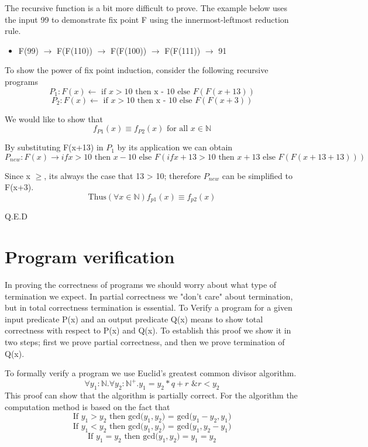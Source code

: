 \documentclass{article}
\begin{document}
The recursive function is a bit more difficult to prove. The example below uses the input 99 to demonstrate fix point F using the innermost-leftmost reduction rule. 

\begin{itemize}
  \item F(99) $\rightarrow$ F(F(110)) $\rightarrow$  F(F(100)) $\rightarrow$ F(F(111)) $\rightarrow$ 91
\end{itemize}

To show the power of fix point induction, consider the following recursive programs
\[P_1: F(x) \leftarrow \text{ if } x > 10\text{ then x - 10 else }F(F(x+13))\]
\[P_2: F(x) \leftarrow \text{ if } x > 10\text{ then x - 10 else }F(F(x+3))\]

We would like to show that 
\[f_{P1} (x) \equiv f_{P2} (x) \text{ for all } x \in \mathbb{N}\] 

By substituting F(x+13) in $P_1$ by its application we can obtain 
\[P_{new}: F(x) \rightarrow if x > 10 \text{ then } x - 10 \text{ else } F( if x + 13 > 10 \text{ then } x + 13 \text{ else } F(F(x+13 + 13)))\]

Since x $\geq$, its always the case that 13 > 10; therefore $P_{new}$ can be simplified to F(x+3). 
\[\text{Thus} (\forall x \in \mathbb{N}) f_{p1} (x) \equiv f_{p2} (x)\]

Q.E.D

\section{Program verification }

In proving the correctness of programs we should worry about what type of termination we expect. In partial correctness we "don't care" about termination, but in total correctness termination is essential. To Verify a program for a given input predicate P(x) and an output predicate Q(x) means to show total correctness with respect to P(x) and Q(x). To establish this proof we show it in two steps; first we prove partial correctness, and then we prove termination of Q(x). 

To formally verify a program we use Euclid's greatest common divisor algorithm. 
\[\forall y_1 :\mathbb{N}. \forall y_2:\mathbb{N}^+ . y_1 = y_2 * q + r \text{ \& } r < y_2\]
This proof can show that the algorithm is partially correct. For the algorithm the computation method is based on the fact that 
\[\text{If  }y_1 >  y_2\text{ then  gcd(}y_1,y_2\text{) =  gcd(}y_1-y_2, y_1)\]
\[\text{If  }y_1 < y_2\text{ then  gcd(}y_1,y_2\text{) =  gcd(}y_1,y_2 - y_1)\]
\[\text{If  }y_1 =  y_2\text{ then  gcd(}y_1,y_2) = y_1 = y_2\]
\end{document}
